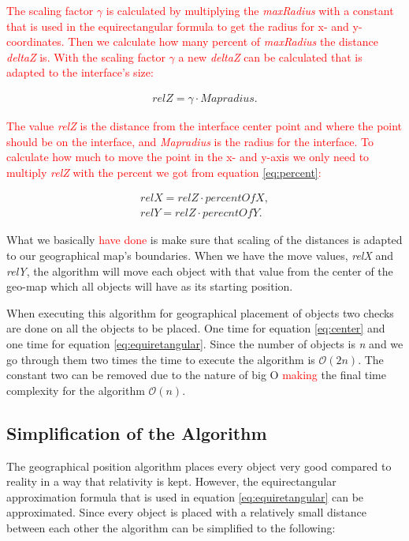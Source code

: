 \textcolor{red}{The scaling factor \textit{$\gamma$} is calculated by multiplying the \textit{maxRadius} with a constant that is used in the equirectangular formula to get the radius for x- and y-coordinates. Then we calculate how many percent of \textit{maxRadius} the distance \textit{deltaZ} is. With the scaling factor \textit{$\gamma$} a new \textit{deltaZ} can be calculated that is adapted to the interface's size: }

\begin{align*}
relZ = \gamma \cdot Mapradius.
\end{align*}

\textcolor{red}{The value \textit{relZ} is the distance from the interface center point and where the point should be on the interface, and \textit{Mapradius} is the radius for the interface. To calculate how much to move the point in the x- and y-axis we only need to multiply \textit{relZ} with the percent we got from equation \ref{eq:percent}:}

\begin{align*}
relX = relZ \cdot percentOfX, \\
relY = relZ \cdot perecntOfY.
\end{align*}

What we basically \textcolor{red}{have done} is make sure that scaling of the distances is adapted to our geographical map's boundaries. When we have the move values, \textit{relX} and \textit{relY}, the algorithm will move each object with that value from the center of the geo-map which all objects will have as its starting position. 

When executing this algorithm for geographical placement of objects two checks are done on all the objects to be placed. One time for equation \ref{eq:center} and one time for equation \ref{eq:equiretangular}. Since the number of objects is \textit{n} and we go through them two times the time to execute the algorithm is $\mathcal{O}(2n)$. The constant two can be removed due to the nature of big O \textcolor{red}{making} the final time complexity for the algorithm $\mathcal{O}(n)$.



\subsection{Simplification of the Algorithm}
\label{sec:limacc}

The geographical position algorithm places every object very good compared to reality in a way that relativity is kept. However, the equirectangular approximation formula that is used in equation \ref{eq:equiretangular} can be approximated. Since every object is placed with a relatively small distance between each other the algorithm can be simplified to the following: 

